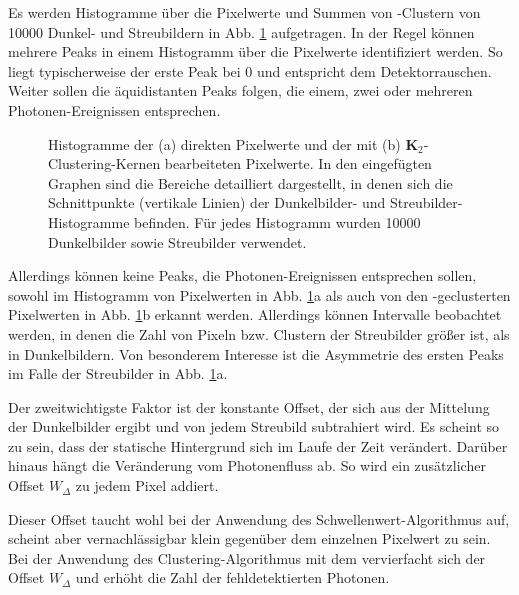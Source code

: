 \noindent
Es werden Histogramme über die Pixelwerte und Summen von -Clustern von \num{10000} Dunkel- und Streubildern in Abb. \ref{fig:no_pr_cl_2_histograms} aufgetragen. In der Regel können mehrere Peaks in einem Histogramm über die Pixelwerte identifiziert werden. So liegt typischerweise der erste Peak bei \SI{0}{\adu} und entspricht dem Detektorrauschen. Weiter sollen die äquidistanten Peaks folgen, die einem, zwei oder mehreren Photonen-Ereignissen entsprechen.
\begin{figure}[H]
    \centering
    
    \caption{Histogramme der (a) direkten Pixelwerte und der mit (b) $\mathbf{K}_2$-Clustering-Kernen bearbeiteten Pixelwerte. In den eingefügten Graphen sind die Bereiche detailliert dargestellt, in denen sich die Schnittpunkte (vertikale Linien) der Dunkelbilder- und Streubilder-Histogramme befinden. Für jedes Histogramm wurden \num{10000} Dunkelbilder sowie Streubilder verwendet.}
    \label{fig:no_pr_cl_2_histograms}
\end{figure}
\noindent
Allerdings können keine Peaks, die Photonen-Ereignissen entsprechen sollen, sowohl im Histogramm von Pixelwerten in Abb. \ref{fig:no_pr_cl_2_histograms}a als auch von den -geclusterten Pixelwerten in Abb. \ref{fig:no_pr_cl_2_histograms}b erkannt werden. Allerdings können Intervalle beobachtet werden, in denen die Zahl von Pixeln bzw. Clustern der Streubilder größer ist, als in Dunkelbildern. Von besonderem Interesse ist die Asymmetrie des ersten Peaks im Falle der Streubilder in Abb. \ref{fig:no_pr_cl_2_histograms}a.

\noindent
Der zweitwichtigste Faktor ist der konstante Offset, der sich aus der Mittelung der Dunkelbilder ergibt und von jedem Streubild subtrahiert wird. Es scheint so zu sein, dass der statische Hintergrund sich im Laufe der Zeit verändert. Darüber hinaus hängt die Veränderung vom Photonenfluss ab. So wird ein zusätzlicher Offset $W_\Delta$ zu jedem Pixel addiert.

\noindent
Dieser Offset taucht wohl bei der Anwendung des Schwellenwert-Algorithmus auf, scheint aber vernachlässigbar klein gegenüber dem einzelnen Pixelwert zu sein. Bei der Anwendung des Clustering-Algorithmus mit dem  vervierfacht sich der Offset $W_\Delta$ und erhöht die Zahl der fehldetektierten Photonen.

